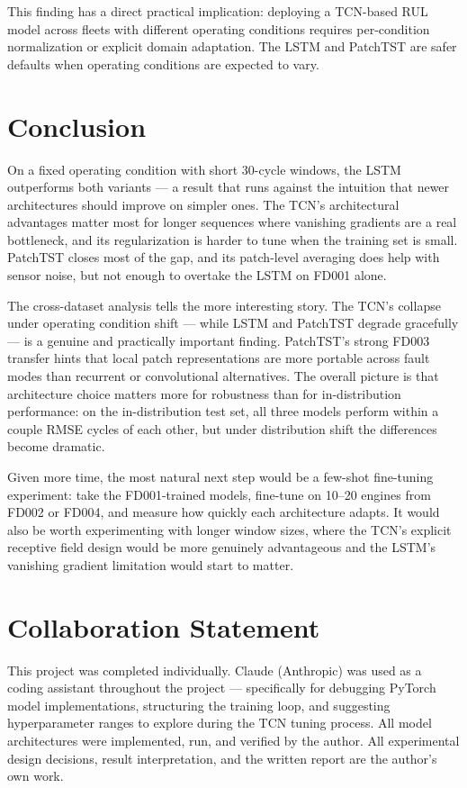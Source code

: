 \documentclass{article}
\begin{document}
This finding has a direct practical implication: deploying a TCN-based RUL model across fleets with different operating conditions requires per-condition normalization or explicit domain adaptation. The LSTM and PatchTST are safer defaults when operating conditions are expected to vary.


\section{Conclusion}

On a fixed operating condition with short 30-cycle windows, the LSTM outperforms both variants — a result that runs against the intuition that newer architectures should improve on simpler ones. The TCN's architectural advantages matter most for longer sequences where vanishing gradients are a real bottleneck, and its regularization is harder to tune when the training set is small. PatchTST closes most of the gap, and its patch-level averaging does help with sensor noise, but not enough to overtake the LSTM on FD001 alone.

The cross-dataset analysis tells the more interesting story. The TCN's collapse under operating condition shift — while LSTM and PatchTST degrade gracefully — is a genuine and practically important finding. PatchTST's strong FD003 transfer hints that local patch representations are more portable across fault modes than recurrent or convolutional alternatives. The overall picture is that architecture choice matters more for robustness than for in-distribution performance: on the in-distribution test set, all three models perform within a couple RMSE cycles of each other, but under distribution shift the differences become dramatic.

Given more time, the most natural next step would be a few-shot fine-tuning experiment: take the FD001-trained models, fine-tune on 10--20 engines from FD002 or FD004, and measure how quickly each architecture adapts. It would also be worth experimenting with longer window sizes, where the TCN's explicit receptive field design would be more genuinely advantageous and the LSTM's vanishing gradient limitation would start to matter.


\section*{Collaboration Statement}

This project was completed individually. Claude (Anthropic) was used as a coding assistant throughout the project — specifically for debugging PyTorch model implementations, structuring the training loop, and suggesting hyperparameter ranges to explore during the TCN tuning process. All model architectures were implemented, run, and verified by the author. All experimental design decisions, result interpretation, and the written report are the author's own work.




\end{document}
